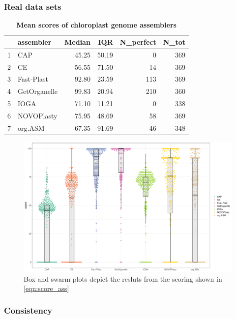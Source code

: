 \subsubsection{Real data sets}
\begin{table}[h!]
\caption{\textbf{Mean scores of chloroplast genome assemblers}}
\label{tab:scores_real}
\centering
\begin{tabular}{rlrrrr}
  \hline
 & assembler & Median & IQR & N\_perfect & N\_tot \\ 
  \hline
1 & CAP & 45.25 & 50.19 &   0 & 369 \\ 
  2 & CE & 56.55 & 71.50 &  14 & 369 \\ 
  3 & Fast-Plast & 92.80 & 23.59 & 113 & 369 \\ 
  4 & GetOrganelle & 99.83 & 20.94 & 210 & 360 \\ 
  5 & IOGA & 71.10 & 11.21 &  0 & 338 \\ 
  6 & NOVOPlasty & 75.95 & 48.69 &  58 & 369 \\ 
  7 & org.ASM & 67.35 & 91.69 &  46 & 348 \\ 
   \hline
\end{tabular}
\end{table}





\begin{figure}[H]
\centering
\includegraphics[height=.45\textheight, width=.95\textwidth]{Figures/swarm}
\decoRule
\caption[Scores of assemblies from real data sets]{Box and swarm plots depict the resluts from the scoring shown in \ref{eqn:score_ass}}
\label{fig:swarm}
\end{figure}




\subsubsection{Consistency}

